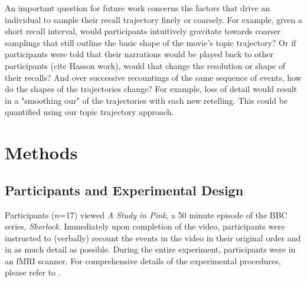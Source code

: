 \documentclass{article}
\begin{document}
{An important question for future work concerns the factors that drive an individual to sample their recall trajectory finely or coarsely. For example, given a short recall interval, would participants intuitively gravitate towards coarser samplings that still outline the basic shape of the movie's topic trajectory? Or if participants were told that their narrations would be played back to other participants (cite Hasson work), would that change the resolution or shape of their recalls? And over successive recountings of the same sequence of events, how do the shapes of the trajectories change? For example, loss of detail would result in a "smoothing our" of the trajectories with each new retelling. This could be quantified using our topic trajectory approach.

\section{Methods}
\label{sec:methods}

\subsection{Participants and Experimental Design}
Participants ($n$=17) viewed \textit{A Study in Pink}, a 50 minute episode of the BBC series, \textit{Sherlock}. Immediately upon completion of the video, participants were instructed to (verbally) recount the events in the video in their original order and in as much detail as possible. During the entire experiment, participants were in an fMRI scanner. For comprehensive details of the experimental procedures, please refer to \cite{ChenEtal17}.

}
\end{document}
